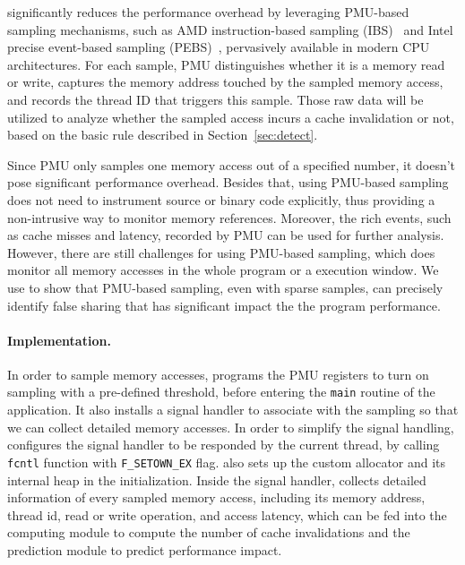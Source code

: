 \cheetah{} significantly reduces the performance overhead by leveraging PMU-based sampling mechanisms, such as AMD instruction-based sampling (IBS)~\cite{AMDIBS:07} and Intel precise event-based sampling (PEBS)~\cite{IntelArch:PEBS:Sept09}, pervasively available in modern CPU architectures. 
For each sample, PMU distinguishes whether it is a memory read or write, captures the memory address touched by the sampled memory access, and records the thread ID that triggers this sample. Those raw data will be utilized to analyze whether the sampled access incurs a cache invalidation or not, based on the basic rule described in Section~\ref{sec:detect}.

Since PMU only samples one memory access out of a specified number, it doesn't pose significant performance overhead. Besides that, using PMU-based sampling does not need to instrument source or binary code explicitly, thus providing a non-intrusive way to monitor memory references. Moreover, the rich events, such as cache misses and latency, recorded by PMU can be used for further analysis. However, there are still challenges for using PMU-based sampling, which does monitor all memory accesses in the whole program or a execution window. We use \cheetah{} to show that PMU-based sampling, even with sparse samples, can precisely identify false sharing that has significant impact the the program performance.

\paragraph{Implementation.} 

In order to sample memory accesses, \cheetah{} programs the PMU registers to turn on sampling with a pre-defined threshold, before entering the \texttt{main} routine of the application. It also installs a signal handler to associate with the sampling so that we can collect detailed memory accesses. In order to simplify the signal handling, \Cheetah{} configures the signal handler to be responded by the current thread, by calling \texttt{fcntl} function with \texttt{F\_SETOWN\_EX} flag. \cheetah{} also sets up the custom allocator and its internal heap in the initialization.
Inside the signal handler, \Cheetah{} collects detailed information of every sampled memory access, including its memory address, thread id, read or write operation, and access latency, which can be fed into the computing module to compute the number of cache invalidations and the prediction module to predict performance impact.

